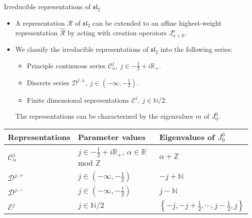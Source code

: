 \documentclass{beamer}
\begin{document}
\begin{frame}{Irreducible representations of \texorpdfstring{$\mathfrak{sl}_{2}$}{Lg}}
  \begin{itemize}
    \item A representation $\mathcal{R}$ of $\mathfrak{sl}_{2}$ can be extended to an affine highest-weight representation 
      $\widehat{\mathcal{R}}$ by acting with creation operators $J^{a}_{n<0}$.
    \item We classify the irreducible representations of $\mathfrak{sl}_{2}$ into the following series:
      \begin{itemize}
        \item Principle continuous series $\mathcal{C}^{j}_{\alpha}, \ j \in -\frac{1}{2} + i \mathbb{R}_{+}$. 
        \item Discrete series $\mathcal{D}^{j,\pm}, \ j \in (- \infty, - \frac{1}{2})$. 
        \item Finite dimensional representations $\mathcal{E}^{j},\ j\in \mathbb{N}/2$.
      \end{itemize}
      The representations can be characterized by the eigenvalues $m$ of $J^{0}_{0}$.
  \end{itemize}
  \vspace{0.5cm}
  \begin{center}
    \begin{tabular}{|l|l|l|}
        \hline
        Representations&Parameter values&Eigenvalues of $J^{0}_{0}$\\
        \hline
        $\mathcal{C}^{j}_{\alpha}$ & $j \in -\frac{1}{2} + i \mathbb{R}_{+} $, $\alpha \in \mathbb{R}$ mod $\mathbb{Z}$& $\alpha + \mathbb{Z}$\\
        $\mathcal{D}^{j,+}$ & $j \in (-\infty,-\frac{1}{2}) $& $-j + \mathbb{N}$\\
        $\mathcal{D}^{j,-}$ & $j \in (-\infty,-\frac{1}{2}) $& $j - \mathbb{N}$\\
        $\mathcal{E}^{j}$ & $j \in \mathbb{N}/2 $ & $\left\{-j,-j+\frac{1}{2}, \cdots, j-\frac{1}{2},j \right\}$\\
        \hline
    \end{tabular}
\end{center}
\end{frame}
\end{document}
